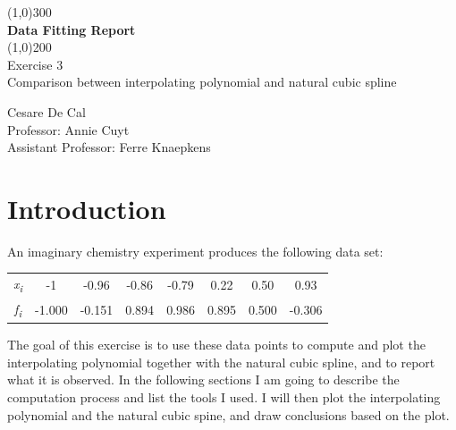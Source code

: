 \documentclass{article}
\begin{document}
\begin{titlepage}
	\begin{center}
	\line(1,0){300}\\
	[0.25in]
	\huge{\bfseries Data Fitting Report}  \\
	\line(1,0){200} \\
	[1.5cm]
	\Large{Exercise 3} \\
	[0.25cm]
	\Large{Comparison between interpolating polynomial and natural cubic spline} \\
	[12cm]
	\end{center}
	\begin{flushright}
	\large{Cesare De Cal \\
	[0.25cm]
	Professor: Annie Cuyt \\
	[0.25cm]
	Assistant Professor: Ferre Knaepkens \\
	}
	\end{flushright}
\end{titlepage}

\section{Introduction}\label{sec:intro}
An imaginary chemistry experiment produces the following data set:

  \begin{table}[!ht]
    \large        %
    \centering    %
    \begin{tabular}{|c|c|c|c|c|c|c|c|}
    \hline
    \it{x}\textsubscript{i}&-1&-0.96&-0.86&-0.79&0.22&0.50&0.93\\     %
    \it{f}\textsubscript{i}&-1.000&-0.151&0.894&0.986&0.895&0.500&-0.306\\
    \hline        %
    \end{tabular}
  \end{table}

The goal of this exercise is to use these data points to compute and plot the interpolating polynomial together with the natural cubic spline, and to report what it is observed. In the following sections I am going to describe the computation process and list the tools I used. I will then plot the interpolating polynomial and the natural cubic spine, and draw conclusions based on the plot.
\end{document}

